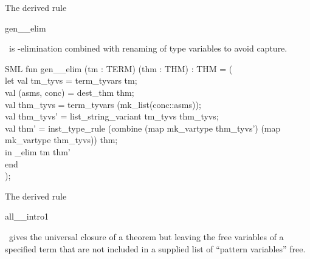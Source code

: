 \documentclass[11pt,a4paper]{article}
\begin{document}
The derived rule 
\begin{INLINEFT}%
\+gen\_\PrLF{}\_elim\\
\end{INLINEFT}%
\ is \PrLF{}-elimination combined with renaming of type variables to avoid capture.
\begin{GFT}{SML}
\+fun \PrNL{}gen\_\PrLF{}\_elim\PrNN{} (tm : TERM) (thm : THM) : THM = (\\
\+	let	val tm\_tyvs = term\_tyvars tm;\\
\+		val (asms, conc) = dest\_thm thm;\\
\+		val thm\_tyvs = term\_tyvars (mk\_list(conc::asms));\\
\+		val thm\_tyvs' = list\_string\_variant tm\_tyvs thm\_tyvs;\\
\+		val thm' = inst\_type\_rule (combine (map mk\_vartype thm\_tyvs') (map mk\_vartype thm\_tyvs)) thm;\\
\+	in	\PrLF{}\_elim tm thm'\\
\+	end\\
\+);\\
\end{GFT}
The derived rule 
\begin{INLINEFT}%
\+all\_\PrLF{}\_intro1\\
\end{INLINEFT}%
\ gives the universal closure of a theorem but leaving the free variables
of a specified term that are not included in a supplied list of ``pattern variables'' free.
\end{document}
